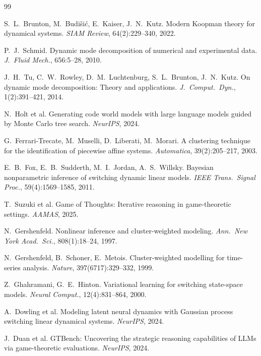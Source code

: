\documentclass[11pt]{article}
\theoremstyle{definition}
\begin{document}
\begin{thebibliography}{99}

 S.~L.~Brunton, M.~Budi{\v{s}}i{\'c}, E.~Kaiser, J.~N.~Kutz. Modern Koopman theory for dynamical systems. \textit{SIAM Review}, 64(2):229--340, 2022.

 P.~J.~Schmid. Dynamic mode decomposition of numerical and experimental data. \textit{J.~Fluid Mech.}, 656:5--28, 2010.

 J.~H.~Tu, C.~W.~Rowley, D.~M.~Luchtenburg, S.~L.~Brunton, J.~N.~Kutz. On dynamic mode decomposition: Theory and applications. \textit{J.~Comput.\ Dyn.}, 1(2):391--421, 2014.

 N.~Holt et al. Generating code world models with large language models guided by Monte Carlo tree search. \textit{NeurIPS}, 2024.

 G.~Ferrari-Trecate, M.~Muselli, D.~Liberati, M.~Morari. A clustering technique for the identification of piecewise affine systems. \textit{Automatica}, 39(2):205--217, 2003.

 E.~B.~Fox, E.~B.~Sudderth, M.~I.~Jordan, A.~S.~Willsky. Bayesian nonparametric inference of switching dynamic linear models. \textit{IEEE Trans.\ Signal Proc.}, 59(4):1569--1585, 2011.

 T.~Suzuki et al. Game of Thoughts: Iterative reasoning in game-theoretic settings. \textit{AAMAS}, 2025.

 N.~Gershenfeld. Nonlinear inference and cluster-weighted modeling. \textit{Ann.\ New York Acad.\ Sci.}, 808(1):18--24, 1997.

 N.~Gershenfeld, B.~Schoner, E.~Metois. Cluster-weighted modelling for time-series analysis. \textit{Nature}, 397(6717):329--332, 1999.

 Z.~Ghahramani, G.~E.~Hinton. Variational learning for switching state-space models. \textit{Neural Comput.}, 12(4):831--864, 2000.

 A.~Dowling et al. Modeling latent neural dynamics with Gaussian process switching linear dynamical systems. \textit{NeurIPS}, 2024.

 J.~Duan et al. GTBench: Uncovering the strategic reasoning capabilities of LLMs via game-theoretic evaluations. \textit{NeurIPS}, 2024.


\end{thebibliography}
\end{document}
